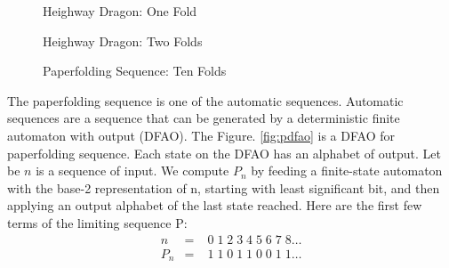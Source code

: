 \documentclass[runningheads,a4]{llncs}
\begin{document}
\begin{figure}[h]
\begin{minipage}[b]{0.3\hsize}
\centering
{}
\caption{Heighway Dragon: One Fold \cite{automatic}}
\label{fig:onefold}
\end{minipage}
\begin{minipage}[b]{0.3\hsize}
\centering
{}
\caption{Heighway Dragon: Two Folds \cite{automatic}}
\label{fig:twofold}
\end{minipage}
\begin{minipage}[b]{0.3\hsize}
\centering
\scalebox{0.015}{
\begin{tikzpicture}
  \draw[blue!50!black,rotate=135,l-system={rule set={X->X+YF,Y->FX-Y},
  step=100pt,angle=90,axiom=FX,order=10},->] l-system;
\end{tikzpicture}
}
\caption{Paperfolding Sequence: Ten Folds \cite{automatic}}
\label{fig:tenfold}
\end{minipage}

\end{figure}
The paperfolding sequence is one of  the automatic sequences.
Automatic sequences are a sequence that can be generated by a deterministic finite automaton with output (DFAO).
The Figure. \ref{fig:pdfao} is a DFAO for  paperfolding sequence.
Each state on the DFAO has an alphabet of output.
Let be $n$ is a sequence of input.
We compute $P_n$ by feeding a finite-state automaton with the base-2 representation of n, starting with least significant bit, and then applying an output alphabet of the last state reached.
Here are the first few terms of the limiting sequence P:
\begin{eqnarray*}
n &=&\;0\; 1\;2\;3\;4\;5\;6\;7\;8 \ldots \\
P_n &=&\;1\; 1\;0\;1\;1\;0\;0\;1\;1 \ldots
\end{eqnarray*}
\end{document}
